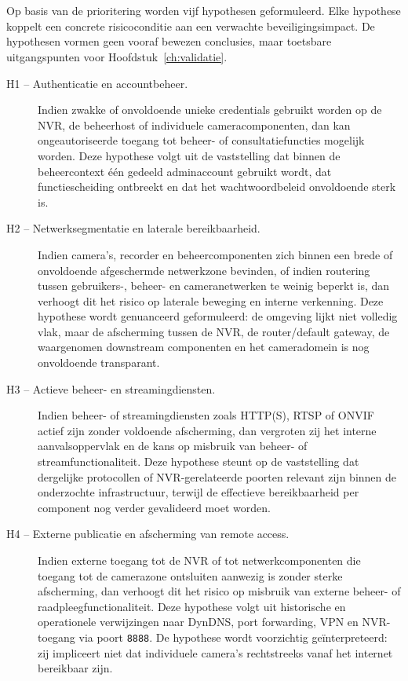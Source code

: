 \section{}%
\label{sec:validatie-hypothesen}

Op basis van de prioritering worden vijf hypothesen geformuleerd. Elke hypothese koppelt een concrete risicoconditie aan een verwachte beveiligingsimpact. De hypothesen vormen geen vooraf bewezen conclusies, maar toetsbare uitgangspunten voor Hoofdstuk~\ref{ch:validatie}.

\begin{description}
    \item[H1 -- Authenticatie en accountbeheer.]
    Indien zwakke of onvoldoende unieke credentials gebruikt worden op de NVR, de beheerhost of individuele cameracomponenten, dan kan ongeautoriseerde toegang tot beheer- of consultatiefuncties mogelijk worden. Deze hypothese volgt uit de vaststelling dat binnen de beheercontext één gedeeld adminaccount gebruikt wordt, dat functiescheiding ontbreekt en dat het wachtwoordbeleid onvoldoende sterk is.
    
    \item[H2 -- Netwerksegmentatie en laterale bereikbaarheid.]
    Indien camera's, recorder en beheercomponenten zich binnen een brede of onvoldoende afgeschermde netwerkzone bevinden, of indien routering tussen gebruikers-, beheer- en cameranetwerken te weinig beperkt is, dan verhoogt dit het risico op laterale beweging en interne verkenning. Deze hypothese wordt genuanceerd geformuleerd: de omgeving lijkt niet volledig vlak, maar de afscherming tussen de NVR, de router/default gateway, de waargenomen downstream componenten en het cameradomein is nog onvoldoende transparant.
    
    \item[H3 -- Actieve beheer- en streamingdiensten.]
    Indien beheer- of streamingdiensten zoals HTTP(S), RTSP of ONVIF actief zijn zonder voldoende afscherming, dan vergroten zij het interne aanvalsoppervlak en de kans op misbruik van beheer- of streamfunctionaliteit. Deze hypothese steunt op de vaststelling dat dergelijke protocollen of NVR-gerelateerde poorten relevant zijn binnen de onderzochte infrastructuur, terwijl de effectieve bereikbaarheid per component nog verder gevalideerd moet worden.
    
    \item[H4 -- Externe publicatie en afscherming van remote access.]
    Indien externe toegang tot de NVR of tot netwerkcomponenten die toegang tot de camerazone ontsluiten aanwezig is zonder sterke afscherming, dan verhoogt dit het risico op misbruik van externe beheer- of raadpleegfunctionaliteit. Deze hypothese volgt uit historische en operationele verwijzingen naar DynDNS, port forwarding, VPN en NVR-toegang via poort \texttt{8888}. De hypothese wordt voorzichtig geïnterpreteerd: zij impliceert niet dat individuele camera's rechtstreeks vanaf het internet bereikbaar zijn.
    

\end{description}
